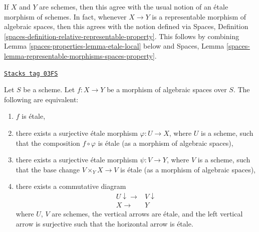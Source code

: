If $X$ and $Y$ are schemes, then this agree with the usual notion of an
\'etale morphism of schemes. In fact, whenever $X \to Y$ is a representable
morphism of algebraic spaces, then this agrees with the notion defined via
Spaces, Definition \ref{spaces-definition-relative-representable-property}.
This follows by combining Lemma \ref{spaces-properties-lemma-etale-local} below and
Spaces, Lemma \ref{spaces-lemma-representable-morphisms-spaces-property}.

\begin{lemma}
\label{spaces-properties-lemma-etale-local}
\href{https://stacks.math.columbia.edu/tag/03FS}{\texttt{Stacks tag 03FS}}

Let $S$ be a scheme.
Let $f : X \to Y$ be a morphism of algebraic spaces over $S$.
The following are equivalent:
\begin{enumerate}
\item $f$ is \'etale,
\item there exists a surjective \'etale morphism $\varphi : U \to X$,
where $U$ is a scheme, such that the composition $f \circ \varphi$ is
\'etale (as a morphism of algebraic spaces),
\item there exists a surjective \'etale morphism $\psi : V \to Y$,
where $V$ is a scheme, such that the base change $V \times_Y X \to V$
is \'etale (as a morphism of algebraic spaces),
\item there exists a commutative diagram
$$
\begin{array}{cc}U \downarrow\longrightarrow & V \downarrow \\ X \longrightarrow & Y\end{array}
$$
where $U$, $V$ are schemes, the vertical arrows are \'etale, and the
left vertical arrow is surjective such that the horizontal arrow is \'etale.
\end{enumerate}
\end{lemma}

